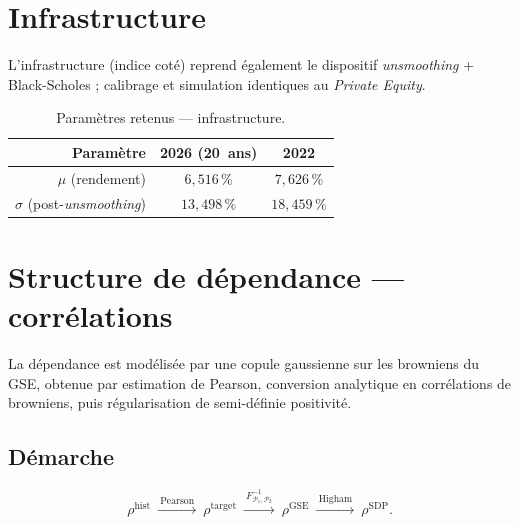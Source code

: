 \documentclass[11pt,a4paper]{article}
\newcommand{\tablehead}[1]{{\sffamily\bfseries\color{nxnavy}#1}}
\begin{document}
\clearpage
\section{Infrastructure}
L'infrastructure (indice coté) reprend également le dispositif \emph{unsmoothing} + Black-Scholes ; calibrage et simulation identiques au \emph{Private Equity}.

\begin{table}[H]
\centering\small
\renewcommand{\arraystretch}{1.4}\setlength{\tabcolsep}{6pt}
\begin{tabularx}{\linewidth}{R c c}
\toprule
\tablehead{Paramètre} & \tablehead{2026 (20~ans)} & \tablehead{2022} \\
\midrule
{} $\mu$ (rendement) & $6{,}516\,\%$ & $7{,}626\,\%$ \\
$\sigma$ (post-\emph{unsmoothing}) & $13{,}498\,\%$ & $18{,}459\,\%$ \\
\bottomrule
\end{tabularx}
\caption{Paramètres retenus --- infrastructure.}
\end{table}

\clearpage
\section{Structure de dépendance --- corrélations}
\label{sec:correl}
La dépendance est modélisée par une copule gaussienne sur les browniens du GSE, obtenue par estimation de Pearson, conversion analytique en corrélations de browniens, puis régularisation de semi-définie positivité.

\subsection{Démarche}
\begin{definitionbox}
\[
\rho^{\mathrm{hist}}\ \xrightarrow{\ \text{Pearson}\ }\ \rho^{\mathrm{target}}
\ \xrightarrow{\ F^{-1}_{\mathcal P_1,\mathcal P_2}\ }\ \rho^{\mathrm{GSE}}
\ \xrightarrow{\ \text{Higham}\ }\ \rho^{\mathrm{SDP}} .
\]
\end{definitionbox}
\end{document}
